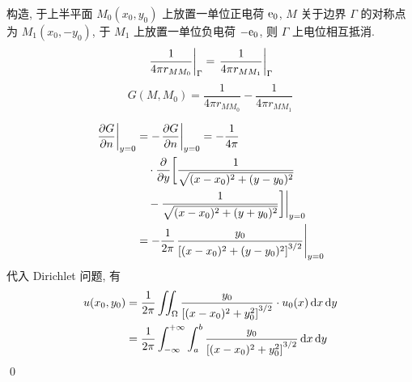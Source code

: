 \begin{solution}
构造, 于上半平面 $M_0(x_0, y_0)$ 上放置一单位正电荷 ${\mathrm e}_0$, $M$ 关于边界
$\Gamma$ 的对称点为 $M_1(x_0, -y_0)$, 于 $M_1$ 上放置一单位负电荷 $-{\mathrm e}_0$,
则 $\Gamma$ 上电位相互抵消.
\[ {\left.{\frac 1{4\pi r_{MM_0}}} \right|}_{\Gamma} =
{\left.{\frac 1{4\pi r_{MM_1}}} \right|}_{\Gamma} \]
\[ G(M, M_0) = \frac 1{4\pi r_{MM_0}} - \frac 1{4\pi r_{MM_1}} \]

\begin{align*}
{\left.{{\frac{\partial {G}}{\partial {n}}}} \right|}_{y=0} &= -{\left.{{\frac{\partial {G}}{\partial {n}}}} \right|}_{y=0}
    = -\frac 1{4\pi} \\
    &\quad\cdot {{\frac{\partial {}}{\partial {y}}}} \bigg[ \frac 1{\sqrt{(x-x_0)^2 + (y-y_0)^2}} \\
    &\quad- \frac 1{\sqrt{(x-x_0)^2 + (y+y_0)^2}} \bigg]\bigg|_{y=0} \\
&= -\frac 1{2\pi} {\left.{\frac{y_0}{{\left[ {
    (x-x_0)^2+(y-y_0)^2
} \right]}^{3/2}}} \right|}_{y=0}
\end{align*}
代入 Dirichlet 问题, 有
\begin{align*}
u(x_0, y_0) &= \frac 1{2\pi} \iint_\Omega \frac{y_0}{{\left[ {
    (x-x_0)^2+y_0^2
} \right]}^{3/2}} \cdot u_0(x) \operatorname{d\!} x \operatorname{d\!} y \\
&= \frac 1{2\pi} \int_{-\infty}^{+\infty} \int_a^b \frac{y_0}{{\left[ {
    (x-x_0)^2+y_0^2
} \right]}^{3/2}}  \operatorname{d\!} x \operatorname{d\!} y \\
\end{align*}
\qed
\end{solution}
\endinput
